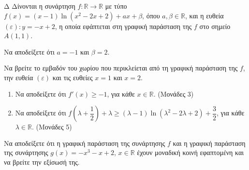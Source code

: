 \begin{thema}{Δ}
Δίνονται η συνάρτηση $f: \mathbb{R} \to \mathbb{R}$ με τύπο $f(x) = (x-1)\ln(x^2 - 2x + 2) + a x + \beta$, όπου $a, \beta \in \mathbb{R}$, και η ευθεία $(\varepsilon): y = -x + 2$, η οποία εφάπτεται στη γραφική παράσταση της $f$ στο σημείο $A(1, 1)$.
\begin{erwthma}
    \item Να αποδείξετε ότι $a = -1$ και $\beta = 2$. 

    \item Να βρείτε το εμβαδόν του χωρίου που περικλείεται από τη γραφική παράσταση της $f$, την ευθεία $(\varepsilon)$ και τις ευθείες $x = 1$ και $x = 2$. 

    \item
    \begin{enumerate}[label=\roman*.]
        \item Να αποδείξετε ότι $f'(x) \geq -1$, για κάθε $x \in \mathbb{R}$. \hfill(Μονάδες 3)
        \item Να αποδείξετε ότι $f\!\left(\lambda + \dfrac{1}{2}\right) + \lambda \geq (\lambda - 1)\ln(\lambda^2 - 2\lambda + 2) + \dfrac{3}{2}$, για κάθε $\lambda \in \mathbb{R}$. \hfill(Μονάδες 5)
    \end{enumerate}

    \item Να αποδείξετε ότι η γραφική παράσταση της συνάρτησης $f$ και η γραφική παράσταση της συνάρτησης $g(x) = -x^3 - x + 2$, $x \in \mathbb{R}$ έχουν μοναδική κοινή εφαπτομένη και να βρείτε την εξίσωσή της. 
\end{erwthma}
\end{thema}

